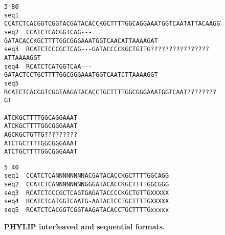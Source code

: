 \documentclass[a4paper,12pt]{article}
\begin{document}
\begin{figure}
\begin{small}
\begin{Verbatim}[frame=single, label=PHYLIP interleaved, samepage=true, baselinestretch=0.5]
5 80
seq1  CCATCTCACGGTCGGTACGATACACCKGCTTTTGGCAGGAAATGGTCAATATTACAAGGT
seq2  CCATCTCACGGTCAG---GATACACCKGCTTTTGGCGGGAAATGGTCAACATTAAAAGAT
seq3  RCATCTCCCGCTCAG---GATACCCCKGCTGTTG????????????????ATTAAAAGGT
seq4  RCATCTCATGGTCAA---GATACTCCTGCTTTTGGCGGGAAATGGTCAATCTTAAAAGGT
seq5  RCATCTCACGGTCGGTAAGATACACCTGCTTTTGGCGGGAAATGGTCAAT????????GT

ATCKGCTTTTGGCAGGAAAT
ATCKGCTTTTGGCGGGAAAT
AGCKGCTGTTG?????????
ATCTGCTTTTGGCGGGAAAT
ATCTGCTTTTGGCGGGAAAT
\end{Verbatim}
\begin{Verbatim}[frame=single, label=PHYLIP sequential, samepage=true, baselinestretch=0.5]
5 40
seq1  CCATCTCANNNNNNNNACGATACACCKGCTTTTGGCAGG
seq2  CCATCTCANNNNNNNNGGGATACACCKGCTTTTGGCGGG
seq3  RCATCTCCCGCTCAGTGAGATACCCCKGCTGTTGXXXXX
seq4  RCATCTCATGGTCAATG-AATACTCCTGCTTTTGXXXXX
seq5  RCATCTCACGGTCGGTAAGATACACCTGCTTTTGxxxxx
\end{Verbatim}
\end{small}
\label{fig:align_tree}
\caption{\bf PHYLIP interleaved and sequential formats.}
\end{figure}
\end{document}

